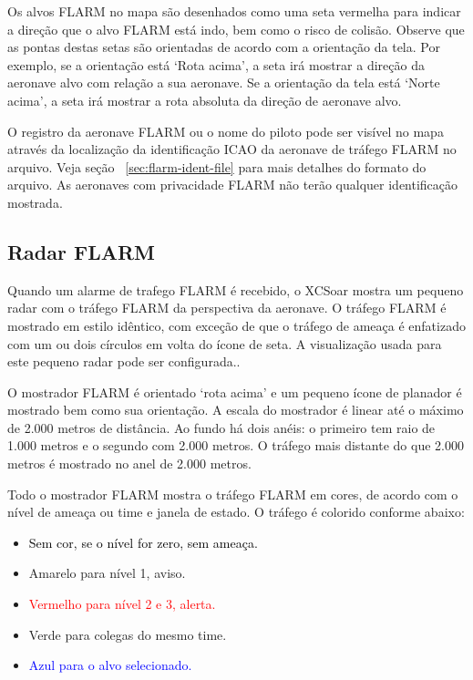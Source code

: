 Os alvos FLARM no mapa são desenhados como uma seta vermelha para indicar a direção que o alvo FLARM está indo, bem como o risco de colisão.  Observe que as pontas destas setas são orientadas de acordo com a orientação da tela.  Por exemplo, se a orientação está ‘Rota acima’, a seta irá mostrar a direção da aeronave alvo com relação a sua aeronave.  Se a orientação da tela está ‘Norte acima’, a seta irá mostrar a rota absoluta da direção de aeronave alvo. 

O registro da aeronave FLARM ou o nome do piloto pode ser visível no mapa através da localização da identificação ICAO da aeronave de tráfego FLARM no arquivo.  Veja seção ~\ref{sec:flarm-ident-file} para mais detalhes do formato do arquivo.  As aeronaves com privacidade FLARM não terão qualquer identificação mostrada. 

\subsection*{Radar FLARM}

Quando um alarme de trafego FLARM é recebido, o XCSoar mostra um pequeno radar com o tráfego FLARM da perspectiva da aeronave.  O tráfego FLARM é mostrado em estilo idêntico, com exceção de que o tráfego de ameaça é enfatizado com um ou dois círculos em volta do ícone de seta.  A visualização usada para este pequeno radar pode ser configurada..

O mostrador FLARM é orientado ‘rota acima’ e um pequeno ícone de planador é mostrado bem como sua orientação.  A escala do mostrador é linear até o máximo de 2.000 metros de distância.  Ao fundo há dois anéis: o primeiro tem raio de 1.000 metros e o segundo com 2.000 metros.  O tráfego mais distante do que 2.000 metros é mostrado no anel de 2.000 metros.

Todo o mostrador FLARM mostra o tráfego FLARM em cores, de acordo com o nível de ameaça ou time e janela de estado.  O tráfego é colorido conforme abaixo:
\begin{itemize}
\item \textcolor{black} {Sem cor, se o nível for zero, sem ameaça.} 
\item \textcolor{warning} { Amarelo para nível 1, aviso.}
\item \textcolor{red} {Vermelho para nível 2 e 3, alerta.}
\item \textcolor{teammate} {Verde para colegas do mesmo time.}
\item \textcolor{blue} {Azul para o alvo selecionado.}
\end{itemize}

